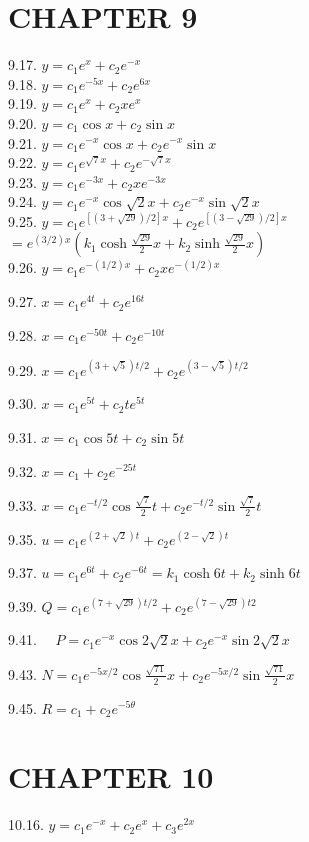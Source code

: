 \documentclass[10pt]{article}
\begin{document}
\section*{CHAPTER 9}
9.17. $y=c_{1} e^{x}+c_{2} e^{-x}$\\
9.18. $y=c_{1} e^{-5 x}+c_{2} e^{6 x}$\\
9.19. $y=c_{1} e^{x}+c_{2} x e^{x}$\\
9.20. $y=c_{1} \cos x+c_{2} \sin x$\\
9.21. $y=c_{1} e^{-x} \cos x+c_{2} e^{-x} \sin x$\\
9.22. $y=c_{1} e^{\sqrt{7} x}+c_{2} e^{-\sqrt{7} x}$\\
9.23. $y=c_{1} e^{-3 x}+c_{2} x e^{-3 x}$\\
9.24. $y=c_{1} e^{-x} \cos \sqrt{2} x+c_{2} e^{-x} \sin \sqrt{2} x$\\
9.25. $y=c_{1} e^{[(3+\sqrt{29}) / 2] x}+c_{2} e^{[(3-\sqrt{29}) / 2] x}$\\
$=e^{(3 / 2) x}\left(k_{1} \cosh \frac{\sqrt{29}}{2} x+k_{2} \sinh \frac{\sqrt{29}}{2} x\right)$\\
9.26. $y=c_{1} e^{-(1 / 2) x}+c_{2} x e^{-(1 / 2) x}$

9.27. $x=c_{1} e^{4 t}+c_{2} e^{16 t}$

9.28. $x=c_{1} e^{-50 t}+c_{2} e^{-10 t}$

9.29. $x=c_{1} e^{(3+\sqrt{5}) t / 2}+c_{2} e^{(3-\sqrt{5}) t / 2}$

9.30. $x=c_{1} e^{5 t}+c_{2} t e^{5 t}$

9.31. $x=c_{1} \cos 5 t+c_{2} \sin 5 t$

9.32. $x=c_{1}+c_{2} e^{-25 t}$

9.33. $x=c_{1} e^{-t / 2} \cos \frac{\sqrt{7}}{2} t+c_{2} e^{-t / 2} \sin \frac{\sqrt{7}}{2} t$

9.35. $u=c_{1} e^{(2+\sqrt{2}) t}+c_{2} e^{(2-\sqrt{2}) t}$

9.37. $u=c_{1} e^{6 t}+c_{2} e^{-6 t}=k_{1} \cosh 6 t+k_{2} \sinh 6 t$

9.39. $Q=c_{1} e^{(7+\sqrt{29}) t / 2}+c_{2} e^{(7-\sqrt{29}) t 2}$

9.41. $\quad P=c_{1} e^{-x} \cos 2 \sqrt{2} x+c_{2} e^{-x} \sin 2 \sqrt{2} x$

9.43. $N=c_{1} e^{-5 x / 2} \cos \frac{\sqrt{71}}{2} x+c_{2} e^{-5 x / 2} \sin \frac{\sqrt{71}}{2} x$

9.45. $R=c_{1}+c_{2} e^{-5 \theta}$

\section*{CHAPTER 10}
10.16. $y=c_{1} e^{-x}+c_{2} e^{x}+c_{3} e^{2 x}$
\end{document}
